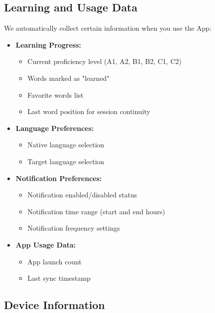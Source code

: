 \documentclass[11pt,a4paper]{article}
\begin{document}
\subsection{Learning and Usage Data}

We automatically collect certain information when you use the App:

\begin{itemize}[leftmargin=2em]
    \item \textbf{Learning Progress:}
    \begin{itemize}
        \item Current proficiency level (A1, A2, B1, B2, C1, C2)
        \item Words marked as "learned"
        \item Favorite words list
        \item Last word position for session continuity
    \end{itemize}
    
    \item \textbf{Language Preferences:}
    \begin{itemize}
        \item Native language selection
        \item Target language selection
    \end{itemize}
    
    \item \textbf{Notification Preferences:}
    \begin{itemize}
        \item Notification enabled/disabled status
        \item Notification time range (start and end hours)
        \item Notification frequency settings
    \end{itemize}
    
    \item \textbf{App Usage Data:}
    \begin{itemize}
        \item App launch count
        \item Last sync timestamp
    \end{itemize}
\end{itemize}

\subsection{Device Information}
\end{document}
